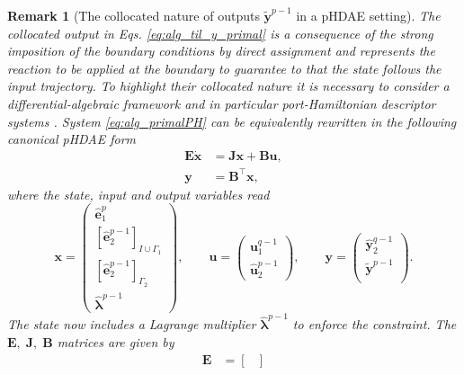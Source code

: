 \documentclass{elsarticle}
\newcommand{\revOne}[1]{{\color{black}#1}}
\newtheorem{remark}{Remark}
\newcommand*{\dual}[1]{\ensuremath{\widehat{#1}}}
\begin{document}
{\revOne{
\begin{remark}[The collocated nature of outputs $\widetilde{\mathbf{y}}^{p-1}$ in a pHDAE setting]\label{rmk:til_y_PHDAE}
The collocated output in Eqs. \eqref{eq:alg_til_y_primal} is a consequence of the strong imposition of the boundary conditions by direct assignment and represents the reaction to be applied at the boundary to guarantee to that the state follows the input trajectory. To highlight their collocated nature it is necessary to consider a differential-algebraic framework and in particular port-Hamiltonian descriptor systems \cite{beattie2018pHDAE}. System \eqref{eq:alg_primalPH} can be equivalently rewritten in the following canonical pHDAE form \cite{beattie2018pHDAE}
\begin{equation}
\begin{aligned}
    \mathbf{E}\dot{\mathbf{x}} &= \mathbf{J}\mathbf{x} + \mathbf{B}\mathbf{u}, \\
    \mathbf{y} &= \mathbf{B}^\top\mathbf{x},
\end{aligned}
\end{equation}
where the state, input and output variables read
\begin{equation}
    \mathbf{x} = \begin{pmatrix}
    {\dual{\mathbf{e}}}^p_1 \\
    [\dual{\mathbf{e}}^{p-1}_2]_{I \cup \Gamma_1} \\
    [\dual{\mathbf{e}}^{p-1}_2]_{\Gamma_2} \\
    \dual{\bm{\lambda}}^{p-1}
    \end{pmatrix}, \qquad 
    \mathbf{u} = \begin{pmatrix}
        \mathbf{u}^{q-1}_1 \\
        \dual{\mathbf{u}}^{p-1}_2
    \end{pmatrix}, \qquad
    \mathbf{y} = \begin{pmatrix}
        \widehat{\mathbf{y}}^{q-1}_2 \\
        \widetilde{\mathbf{y}}^{p-1} \\
    \end{pmatrix}.
\end{equation}
The state now includes a Lagrange multiplier $\dual{\bm{\lambda}}^{p-1}$ to enforce the constraint. The $\mathbf{E}, \; \mathbf{J}, \; \mathbf{B}$ matrices are given by
\begin{equation}
\begin{aligned}
    \mathbf{E} &= \begin{bmatrix}

\end{bmatrix}
\end{aligned}
\end{equation}
\end{remark}}}
\end{document}
